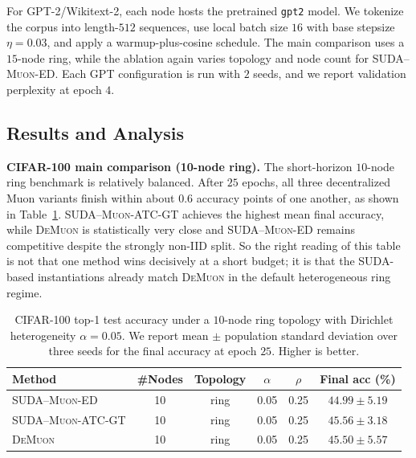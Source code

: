 \documentclass{article}
\begin{document}
For GPT-2/Wikitext-2, each node hosts the pretrained \texttt{gpt2} model. We
tokenize the corpus into length-$512$ sequences, use local batch size $16$ with base stepsize $\eta = 0.03$, and apply a
warmup-plus-cosine schedule. The main comparison uses a $15$-node ring, while
the ablation again varies topology and node count for
\textsc{SUDA--Muon-ED}. Each GPT configuration is run with $2$ seeds, and we
report validation perplexity at epoch $4$.


\subsection{Results and Analysis}
\label{subsec:results-analysis}


\textbf{CIFAR-100 main comparison (10-node ring).}
The short-horizon $10$-node ring benchmark is relatively balanced. After $25$ epochs, all three decentralized Muon variants finish within about $0.6$ accuracy points of one another, as shown in Table~\ref{tab:cifar-main}. \textsc{SUDA--Muon-ATC-GT} achieves the highest
mean final accuracy, while \textsc{DeMuon} is statistically very close and
\textsc{SUDA--Muon-ED} remains competitive despite the strongly non-IID split.
So the right reading of this table is not that one method wins decisively at a short budget; it is that the SUDA-based instantiations already match \textsc{DeMuon} in the default heterogeneous ring regime.


\begin{table}[t!]
    \centering
    \caption{CIFAR-100 top-1 test accuracy under a $10$-node ring topology
    with Dirichlet heterogeneity $\alpha = 0.05$. We report mean $\pm$
    population standard deviation over three seeds for the final accuracy at
    epoch $25$. Higher is better.}
    \label{tab:cifar-main}
    \begin{tabular}{lccccc}
        \toprule
        Method & \#Nodes & Topology & $\alpha$ & $\rho$ & Final acc (\%) \\
        \midrule
        \textsc{SUDA--Muon-ED}     & 10 & ring & 0.05 & 0.25 & $44.99 \pm 5.19$ \\
        \textsc{SUDA--Muon-ATC-GT} & 10 & ring & 0.05 & 0.25 & $\mathbf{45.56 \pm 3.18}$ \\
        \textsc{DeMuon}            & 10 & ring & 0.05 & 0.25 & $45.50 \pm 5.57$ \\
        \bottomrule
    \end{tabular}
\end{table}
\end{document}
